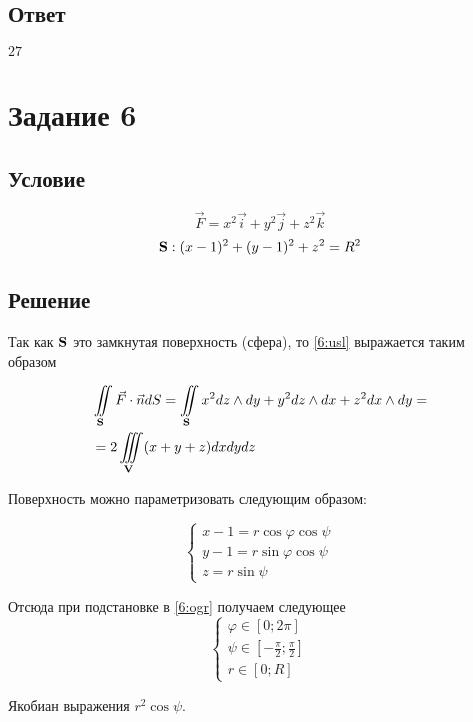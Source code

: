\documentclass{report}
\newcommand*\task[1]{
       \chapter{#1}
       \section{Условие}
}
\newcommand*\doubleint[2]{\iint\limits_{#1}#2}
\newcommand*\tripleint[2]{\iiint\limits_{#1}#2}
\begin{document}
\section{Ответ}

$27$

\task{Задание 6}

\begin{equation}
    \label{6:usl}
    \vec{F} = x^2 \vec{i} + y^2 \vec{j} + z^2 \vec{k}
\end{equation}
\begin{equation}
    \label{6:ogr}
    {\bf{S}}: (x - 1)^2 + (y - 1)^2 + z^2 = R^2
\end{equation}

\section{Решение}

Так как ${\bf{S}}$ это замкнутая поверхность (сфера), то \ref{6:usl} выражается таким образом

\begin{align*}
     & \doubleint{{\bf{S}}}{\vec{F} \cdot \vec{n} dS} = \doubleint{{\bf{S}}}{x^2 dz \wedge dy + y^2 dz \wedge dx + z^2 dx \wedge dy} = \\
     & = 2\tripleint{{\bf{V}}}{(x + y + z)dx dy dz}
\end{align*}

Поверхность можно параметризовать следующим образом:

$$
    \begin{cases}
        x - 1 = r \cos \varphi \cos \psi \\
        y - 1 = r \sin \varphi \cos \psi \\
        z = r \sin \psi
    \end{cases}
$$

Отсюда при подстановке в \ref{6:ogr} получаем следующее
$$
    \begin{cases}
        \varphi \in [0; 2\pi]                    \\
        \psi \in [-\frac{\pi}{2}; \frac{\pi}{2}] \\
        r \in [0; R]
    \end{cases}
$$

Якобиан выражения $r^2 \cos \psi$.
\end{document}
